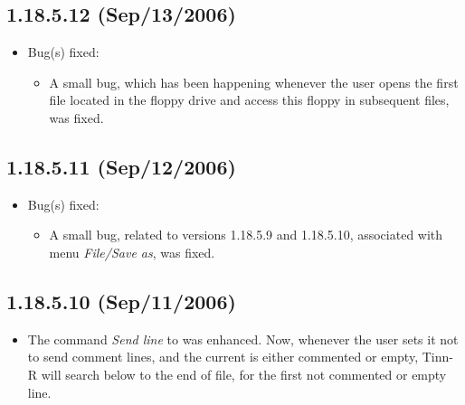 \subsection*{1.18.5.12 (Sep/13/2006)}
\begin{itemize}
  \item Bug(s) fixed:
    \begin{itemize}
      \item A small bug, which has been happening whenever the user opens the first file
        located in the floppy drive and access this floppy in subsequent files, was fixed.
    \end{itemize}
\end{itemize}


\subsection*{1.18.5.11 (Sep/12/2006)}
\begin{itemize}
  \item Bug(s) fixed:
    \begin{itemize}
      \item A small bug, related to versions 1.18.5.9 and 1.18.5.10, associated with
        menu \textit{File/Save as}, was fixed.
    \end{itemize}
\end{itemize}


\subsection*{1.18.5.10 (Sep/11/2006)}
\begin{itemize}
  \item The command \textit{Send line} to \RR{} was enhanced. Now, whenever
    the user sets it not to send comment lines, and the current is either
    commented or empty, Tinn-R will search below to the end of file, for
    the first not commented or empty line.
\end{itemize}


